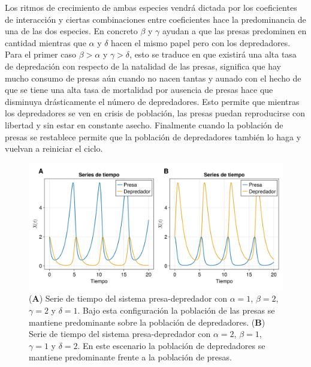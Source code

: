 Los ritmos de crecimiento de ambas especies vendrá dictada por los coeficientes de interacción y ciertas combinaciones entre coeficientes hace la predominancia de una de las dos especies. En concreto $\beta$ y $\gamma$ ayudan a que las presas predominen en cantidad mientras que $\alpha$ y $\delta$ hacen el mismo papel pero con los depredadores. Para el primer caso $\beta >\alpha$ y $\gamma>\delta$, esto se traduce en que existirá una alta tasa de depredación con respecto de la natalidad de las presas, significa que hay mucho consumo de presas aún cuando no nacen tantas y aunado con el hecho de que se tiene una alta tasa de mortalidad por ausencia de presas hace que disminuya drásticamente el número de depredadores. Esto permite que mientras los depredadores se ven en crisis de población, las presas puedan reproducirse con libertad y sin estar en constante asecho. Finalmente cuando la población de presas se restablece permite que la población de depredadores también lo haga y vuelvan a reiniciar el ciclo.\newpage 
\begin{figure}[h!]
	\centering
	\includegraphics[scale=0.23]{../../Imagenes/Series de Tiempo PD}
	\caption{(\textbf{A}) Serie de tiempo del sistema presa-depredador con $\alpha=1$, $\beta=2$, $\gamma=2$ y $\delta=1$. Bajo esta configuración la población de las presas se mantiene predominante sobre la población de depredadores. (\textbf{B}) Serie de tiempo del sistema presa-depredador con $\alpha=2$, $\beta = 1$, $\gamma = 1$ y $\delta = 2$. En este escenario la población de depredadores se mantiene predominante frente a la población de presas.}
	\label{fig:SeriesdeTiempoPD}
\end{figure}
